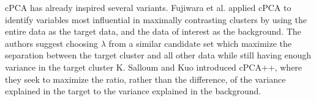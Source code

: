 \documentclass[12pt]{article}
\begin{document}
     cPCA has already inspired several variants. Fujiwara et al.  \cite{Fujiwara} applied cPCA to identify variables most influential in maximally contrasting clusters by using the entire data as the target data, and the data of interest as the background. The authors suggest choosing $\lambda$ from a similar candidate set which maximize  the separation between the target cluster and all other data while still having enough variance in the target cluster K. %
    Salloum and Kuo  \cite{Salloum} introduced cPCA++, %
    where they seek to maximize the ratio, rather than the difference, of the variance explained in the target to the variance explained in the background.%
\end{document}
